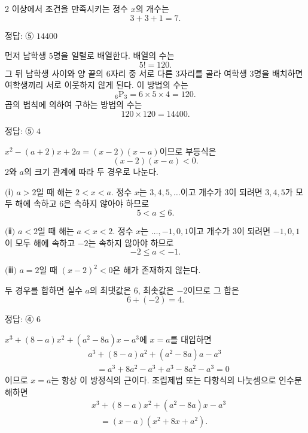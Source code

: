 \documentclass[10pt]{article}
\begin{document}
\begin{multicols}{2}
이상에서 조건을 만족시키는 정수 $x$의 개수는
\[ 3 + 3 + 1 = 7. \]

\begin{answerbox}정답: ⑤ $14400$\end{answerbox}

먼저 남학생 $5$명을 일렬로 배열한다. 배열의 수는
\[ 5! = 120. \]
그 뒤 남학생 사이와 양 끝의 $6$자리 중 서로 다른 $3$자리를 골라 여학생 $3$명을 배치하면 여학생끼리 서로 이웃하지 않게 된다. 이 방법의 수는
\[ {}_6\mathrm{P}_3 = 6 \times 5 \times 4 = 120. \]
곱의 법칙에 의하여 구하는 방법의 수는
\[ 120 \times 120 = 14400. \]

\begin{answerbox}정답: ⑤ $4$\end{answerbox}

$x^2 - (a + 2)x + 2a = (x - 2)(x - a)$이므로 부등식은
\[ (x - 2)(x - a) < 0. \]
$2$와 $a$의 크기 관계에 따라 두 경우로 나눈다.

$(\!$ⅰ$)$ $a > 2$일 때 해는 $2 < x < a$. 정수 $x$는 $3, 4, 5, \ldots$이고 개수가 $3$이 되려면 $3, 4, 5$가 모두 해에 속하고 $6$은 속하지 않아야 하므로
\[ 5 < a \le 6. \]

$(\!$ⅱ$)$ $a < 2$일 때 해는 $a < x < 2$. 정수 $x$는 $\ldots, -1, 0, 1$이고 개수가 $3$이 되려면 $-1, 0, 1$이 모두 해에 속하고 $-2$는 속하지 않아야 하므로
\[ -2 \le a < -1. \]

$(\!$ⅲ$)$ $a = 2$일 때 $(x - 2)^2 < 0$은 해가 존재하지 않는다.

두 경우를 합하면 실수 $a$의 최댓값은 $6$, 최솟값은 $-2$이므로 그 합은
\[ 6 + (-2) = 4. \]

\begin{answerbox}정답: ④ $6$\end{answerbox}

$x^3 + (8 - a)x^2 + (a^2 - 8a)x - a^3$에 $x = a$를 대입하면
\begin{align*}
&a^3 + (8-a)a^2 + (a^2 - 8a)a - a^3 \\
&\quad = a^3 + 8a^2 - a^3 + a^3 - 8a^2 - a^3 = 0
\end{align*}
이므로 $x = a$는 항상 이 방정식의 근이다. 조립제법 또는 다항식의 나눗셈으로 인수분해하면
\begin{align*}
&x^3 + (8-a)x^2 + (a^2-8a)x - a^3 \\
&\quad = (x - a)(x^2 + 8x + a^2).
\end{align*}


\end{multicols}
\end{document}
